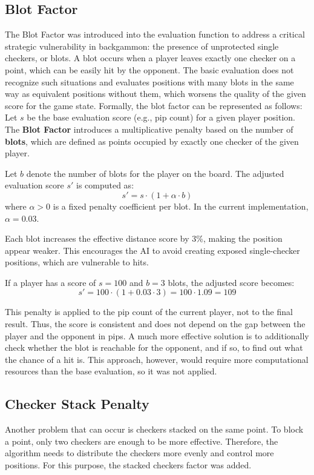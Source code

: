 \subsection*{Blot Factor}
The Blot Factor was introduced into the evaluation function to address a critical strategic vulnerability in backgammon: the presence of unprotected single checkers, or blots. A blot occurs when a player leaves exactly one checker on a point, which can be easily hit by the opponent. The basic evaluation does not recognize such situations and evaluates positions with many blots in the same way as equivalent positions without them, which worsens the quality of the given score for the game state.
Formally, the blot factor can be represented as follows:
Let $s$ be the base evaluation score (e.g., pip count) for a given player position. The \textbf{Blot Factor} introduces a multiplicative penalty based on the number of \textbf{blots}, which are defined as points occupied by exactly one checker of the given player.

Let $b$ denote the number of blots for the player on the board. The adjusted evaluation score $s'$ is computed as:
\[
s' = s \cdot (1 + \alpha \cdot b)
\]
where $\alpha > 0$ is a fixed penalty coefficient per blot. In the current implementation, $\alpha = 0.03$.

Each blot increases the effective distance score by 3\%, making the position appear weaker. This encourages the AI to avoid creating exposed single-checker positions, which are vulnerable to hits. 

If a player has a score of $s = 100$ and $b = 3$ blots, the adjusted score becomes:
\[
s' = 100 \cdot (1 + 0.03 \cdot 3) = 100 \cdot 1.09 = 109
\]

This penalty is applied to the pip count of the current player, not to the final result. Thus, the score is consistent and does not depend on the gap between the player and the opponent in pips. A much more effective solution is to additionally check whether the blot is reachable for the opponent, and if so, to find out what the chance of a hit is. This approach, however, would require more computational resources than the base evaluation, so it was not applied.

\subsection*{Checker Stack Penalty}
Another problem that can occur is checkers stacked on the same point. To block a point, only two checkers are enough to be more effective. Therefore, the algorithm needs to distribute the checkers more evenly and control more positions. For this purpose, the stacked checkers factor was added.

